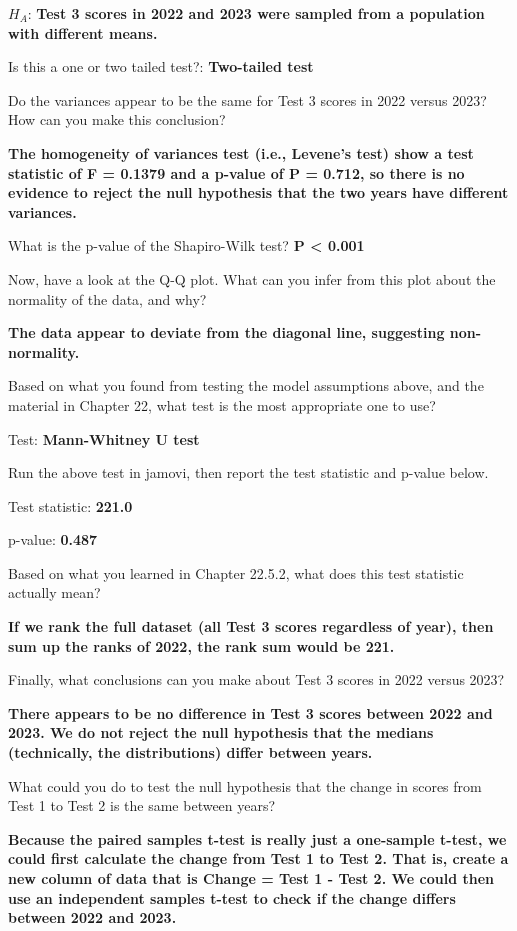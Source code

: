\documentclass[
]{scrbook}
\begin{document}
\(H_{A}\): \textbf{Test 3 scores in 2022 and 2023 were sampled from a population with different means.}

Is this a one or two tailed test?: \textbf{Two-tailed test}

Do the variances appear to be the same for Test 3 scores in 2022 versus 2023? How can you make this conclusion?

\textbf{The homogeneity of variances test (i.e., Levene's test) show a test statistic of F = 0.1379 and a p-value of P = 0.712, so there is no evidence to reject the null hypothesis that the two years have different variances.}

What is the p-value of the Shapiro-Wilk test? \textbf{P \textless{} 0.001}

Now, have a look at the Q-Q plot. What can you infer from this plot about the normality of the data, and why?

\textbf{The data appear to deviate from the diagonal line, suggesting non-normality.}

Based on what you found from testing the model assumptions above, and the material in Chapter 22, what test is the most appropriate one to use?

Test: \textbf{Mann-Whitney U test}

Run the above test in jamovi, then report the test statistic and p-value below.

Test statistic: \textbf{221.0}

p-value: \textbf{0.487}

Based on what you learned in Chapter 22.5.2, what does this test statistic actually mean?

\textbf{If we rank the full dataset (all Test 3 scores regardless of year), then sum up the ranks of 2022, the rank sum would be 221.}

Finally, what conclusions can you make about Test 3 scores in 2022 versus 2023?

\textbf{There appears to be no difference in Test 3 scores between 2022 and 2023. We do not reject the null hypothesis that the medians (technically, the distributions) differ between years.}

What could you do to test the null hypothesis that the change in scores from Test 1 to Test 2 is the same between years?

\textbf{Because the paired samples t-test is really just a one-sample t-test, we could first calculate the change from Test 1 to Test 2. That is, create a new column of data that is Change = Test 1 - Test 2. We could then use an independent samples t-test to check if the change differs between 2022 and 2023.}
\end{document}
